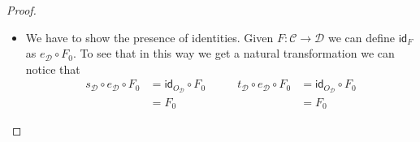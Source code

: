 \documentclass[a4paper,UKenglish,cleveref,pdftex,thm-restate,numberwithinsect]{lipics-v2021}
\newcommand{\id}[1]{\mathsf{id}_{#1}}
\begin{document}
\begin{proof}
\begin{enumerate}
\begin{itemize}
			Summming up, all the internal subdiagram of the following one are commutative and so the whole diagram commutes too. But this is exactly the thesis.
			\[\xymatrix{O_{\mathcal{C}} \ar[r]_{\zeta} \ar[dr]_{\phi_{(\epsilon_1, \delta)}} \ar@/^.4cm/[rrr]^{\phi_{(\alpha, \epsilon_2)}}& Q_{\mathcal{D}}\ar[d]^{\theta_{\mathcal{D}}} \ar[r]_{\psi_{\mathcal{D}}}& Q_{\mathcal{D}}' \ar[r]_{\theta_{\mathcal{D}}'} & P_{\mathcal{D}} \ar[d]^{\gamma_{\mathcal{D}}}\\ & P_{\mathcal{D}} \ar[rr]_{\gamma_{\mathcal{D}}}&& A_{\mathcal{D}}}\]
				\item We have to show the presence of identities. Given $F\colon \mathcal{C}\to \mathcal{D}$ we can define $\id{F}$ as $e_{\mathcal{D}}\circ F_0$.  To see that in this way we get a natural transformation we can notice that
				\[\begin{split}
					s_{\mathcal{D}}\circ e_{\mathcal{D}}\circ F_0&= \id{O_{\mathcal{D}}}\circ F_0\\&=F_0
				\end{split}\qquad \begin{split}
					t_{\mathcal{D}}\circ e_{\mathcal{D}}\circ F_0&= \id{O_{\mathcal{D}}}\circ F_0\\&=F_0
				\end{split}\]
				

\end{itemize}
\end{enumerate}
\end{proof}
\end{document}
